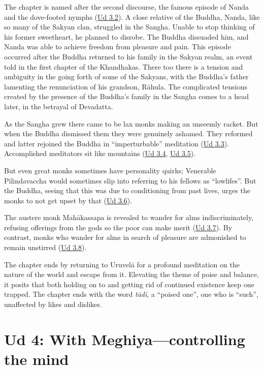 \documentclass[12pt,openany]{book}%
\begin{document}
The chapter is named after the second discourse, the famous episode of Nanda and the dove-footed nymphs (\href{https://suttacentral.net/ud3.2/en/sujato}{Ud 3.2}). A close relative of the Buddha, Nanda, like so many of the Sakyan clan, struggled in the Sangha. Unable to stop thinking of his former sweetheart, he planned to disrobe. The Buddha dissuaded him, and Nanda was able to achieve freedom from pleasure and pain. This episode occurred after the Buddha returned to his family in the Sakyan realm, an event told in the first chapter of the Khandhakas. There too there is a tension and ambiguity in the going forth of some of the Sakyans, with the Buddha’s father lamenting the renunciation of his grandson, \textsanskrit{Rāhula}. The complicated tensions created by the presence of the Buddha’s family in the Sangha comes to a head later, in the betrayal of Devadatta.

As the Sangha grew there came to be lax monks making an unseemly racket. But when the Buddha dismissed them they were genuinely ashamed. They reformed and latter rejoined the Buddha in “imperturbable” meditation (\href{https://suttacentral.net/ud3.3/en/sujato}{Ud 3.3}). Accomplished meditators sit like mountains (\href{https://suttacentral.net/ud3.4/en/sujato}{Ud 3.4}, \href{https://suttacentral.net/ud3.5/en/sujato}{Ud 3.5}). 

But even great monks sometimes have personality quirks; Venerable Pilindavaccha would sometimes slip into referring to his fellows as “lowlifes”. But the Buddha, seeing that this was due to conditioning from past lives,  urges the monks to not get upset by that (\href{https://suttacentral.net/ud3.6/en/sujato}{Ud 3.6}). 

The austere monk \textsanskrit{Mahākassapa} is revealed to wander for alms indiscriminately, refusing offerings from the gods so the poor can make merit (\href{https://suttacentral.net/ud3.7/en/sujato}{Ud 3.7}). By contrast, monks who wander for alms in search of pleasure are admonished to remain unstirred (\href{https://suttacentral.net/ud3.8/en/sujato}{Ud 3.8}). 

The chapter ends by returning to \textsanskrit{Uruvelā} for a profound meditation on the nature of the world and escape from it. Elevating the theme of poise and balance, it posits that both holding on to and getting rid of continued existence keep one trapped. The chapter ends with the word \textit{\textsanskrit{tādi}}, a “poised one”, one who is “such”, unaffected by likes and dislikes. 

\section*{Ud 4: With Meghiya—controlling the mind}
\end{document}
